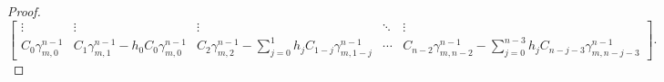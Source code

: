 \documentclass[11pt,oneside]{article}
\theoremstyle{plain}
\theoremstyle{plain}
\theoremstyle{definition}
\numberwithin{figure}{section}
\theoremstyle{remark}
\numberwithin{equation}{section}
\begin{document}
\begin{proof}
{\[\begin{bmatrix}
				\vdots & \vdots & \vdots & \ddots & \vdots \\
				
				C_0 \gamma_{m,0}^{n-1} 
				& C_1 \gamma_{m,1}^{n-1} - h_0C_0\gamma_{m,0}^{n-1} 
				& C_2 \gamma_{m,2}^{n-1} - \displaystyle\sum_{j=0}^{1} h_j C_{1-j}\gamma_{m,1-j}^{n-1} 
				& \cdots 
				& C_{n-2} \gamma_{m,n-2}^{n-1} - \displaystyle\sum_{j=0}^{n-3} h_j C_{n-j-3}\gamma_{m, n-j-3}^{n-1}
			\end{bmatrix}.
			\]
		}
		
		
		
		
		

\end{proof}
\end{document}
